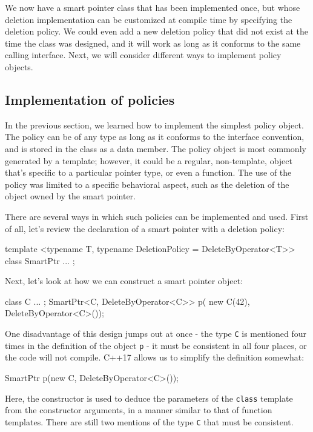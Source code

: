 We now have a smart pointer class that has been implemented once, but whose deletion implementation can be customized at compile time by specifying the deletion policy. We could even add a new deletion policy that did not exist at the time the class was designed, and it will work as long as it conforms to the same calling interface. Next, we will consider different ways to implement policy objects.

\subsection{Implementation of policies}

In the previous section, we learned how to implement the simplest policy object. The policy can be of any type as long as it conforms to the interface convention, and is stored in the class as a data member. The policy object is most commonly generated by a template; however, it could be a regular, non-template, object that's specific to a particular pointer type, or even a function. The use of the policy was limited to a specific behavioral aspect, such as the deletion of the object owned by the smart pointer.

There are several ways in which such policies can be implemented and used. First of all, let's review the declaration of a smart pointer with a deletion policy:

\begin{code}
template <typename T,
          typename DeletionPolicy = DeleteByOperator<T>>
class SmartPtr { ... };
\end{code}

Next, let's look at how we can construct a smart pointer object:

\begin{code}
class C { ... };
SmartPtr<C, DeleteByOperator<C>> p(
  new C(42), DeleteByOperator<C>());
\end{code}

One disadvantage of this design jumps out at once - the type \texttt{C} is mentioned four times in the definition of the object \texttt{p} - it must be consistent in all four places, or the code will not compile. C++17 allows us to simplify the definition somewhat:

\begin{code}
SmartPtr p(new C, DeleteByOperator<C>());
\end{code}

Here, the constructor is used to deduce the parameters of the \texttt{class} template from the constructor arguments, in a manner similar to that of function templates. There are still two mentions of the type \texttt{C} that must be consistent.

